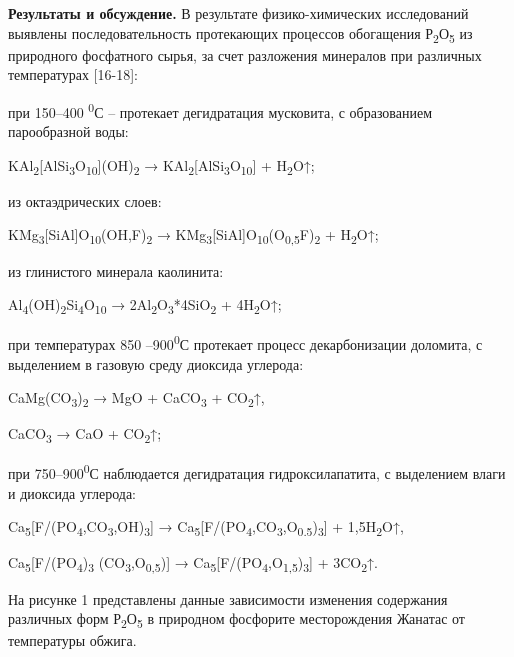 \textbf{Результаты и обсуждение.} В результате физико-химических
исследований выявлены последовательность протекающих процессов
обогащения Р\textsubscript{2}О\textsubscript{5} из природного фосфатного
сырья, за счет разложения минералов при различных температурах
{[}16-18{]}:

при 150--400 \textsuperscript{0}С -- протекает дегидратация мусковита, с
образованием парообразной воды:

KAl\textsubscript{2}{[}AlSi\textsubscript{3}O\textsubscript{10}{]}(OH)\textsubscript{2}
→ KAl\textsubscript{2}{[}AlSi\textsubscript{3}O\textsubscript{10}{]} +
H\textsubscript{2}O↑;

из октаэдрических слоев:

KMg\textsubscript{3}{[}SiAl{]}O\textsubscript{10}(OH,F)\textsubscript{2}
→
KMg\textsubscript{3}{[}SiAl{]}O\textsubscript{10}(O\textsubscript{0,5}F)\textsubscript{2}
+ H\textsubscript{2}O↑;

из глинистого минерала каолинита:

Al\textsubscript{4}(OH)\textsubscript{2}Si\textsubscript{4}O\textsubscript{10}
→ 2Al\textsubscript{2}O\textsubscript{3}*4SiO\textsubscript{2} +
4H\textsubscript{2}O↑;

при температурах 850 --900\textsuperscript{0}С протекает процесс
декарбонизации доломита, с выделением в газовую среду диоксида углерода:

CaMg(CO\textsubscript{3})\textsubscript{2} → MgO + CaCO\textsubscript{3}
+ CO\textsubscript{2}↑,

CaCO\textsubscript{3} → CaO + CO\textsubscript{2}↑;

при 750--900\textsuperscript{0}С наблюдается дегидратация
гидроксилапатита, с выделением влаги и диоксида углерода:

Ca\textsubscript{5}{[}F/(PO\textsubscript{4},CO\textsubscript{3},OH)\textsubscript{3}{]}
→
Ca\textsubscript{5}{[}F/(PO\textsubscript{4},CO\textsubscript{3},O\textsubscript{0.5})\textsubscript{3}{]}
+ 1,5H\textsubscript{2}O↑,

Ca\textsubscript{5}{[}F/(PO\textsubscript{4})\textsubscript{3}
(CO\textsubscript{3},O\textsubscript{0,5}){]} →
Ca\textsubscript{5}{[}F/(PO\textsubscript{4},O\textsubscript{1,5})\textsubscript{3}{]}
+ 3CO\textsubscript{2}↑.

На рисунке 1 представлены данные зависимости изменения содержания
различных форм Р\textsubscript{2}О\textsubscript{5} в природном
фосфорите месторождения Жанатас от температуры обжига.

